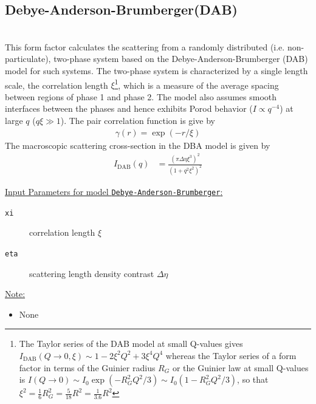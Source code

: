 
\clearpage
\subsection{Debye-Anderson-Brumberger(DAB)}
\label{sect:DAB}~\\

This form factor calculates the scattering from a randomly
distributed (i.e. non-particulate), two-phase system based on the
Debye-Anderson-Brumberger (DAB) \cite{DAB1957,DebyeBueche1949} model
for such systems. The two-phase system is characterized by a single
length scale, the correlation length $\xi$\footnote{
The Taylor series of the DAB model at small Q-values gives $I_\text{DAB}(Q\rightarrow 0,\xi) \sim 1-2\xi^2Q^2+3\xi^4Q^4$ whereas the Taylor series of a form factor in terms of the Guinier radius $R_G$ or the Guinier law at small Q-values is $I(Q\rightarrow 0)\sim I_0\exp\left(-R_G^2Q^2/3\right)\sim I_0 \left(1-R_G^2Q^2/3\right)$, so that $\xi^2=\frac{1}{6} R_G^2=\frac{5}{18} R^2=\frac{1}{3.6} R^2$
}, which is a measure of
the average spacing between regions of phase 1 and phase 2. The
model also assumes smooth interfaces between the phases and hence
exhibits Porod behavior ($I \propto q^{-4}$) at large $q$ ($q \xi
\gg 1$). The pair correlation function is give by
\cite{DebyeBueche1949}
\begin{align}
\gamma(r) = \exp(-r/\xi)
\end{align}
The macroscopic scattering cross-section in the DBA model is given
by
\begin{align}
I_\mathrm{DAB}(q) &= \frac{\left(\pi\Delta\eta\xi^3\right)^2}{\left(1+q^2\xi^2\right)^2}
\end{align}


\uline{Input Parameters for model \texttt{Debye-Anderson-Brumberger}:}\\
\begin{description}
\item[\texttt{xi}] correlation length $\xi$
\item[\texttt{eta}] scattering length density contrast $\Delta\eta$
\end{description}

\uline{Note:}
\begin{itemize}
\item None
\end{itemize}


